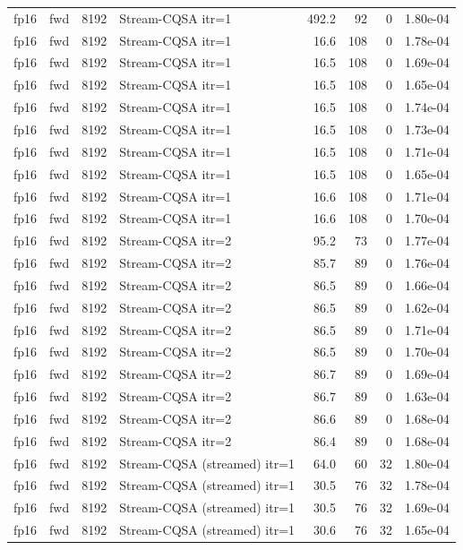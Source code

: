 \begin{tabular}{llrlrrrl}
fp16 & fwd & 8192 & Stream-CQSA itr=1 & 492.2 & 92 & 0 & 1.80e-04 \\
fp16 & fwd & 8192 & Stream-CQSA itr=1 & 16.6 & 108 & 0 & 1.78e-04 \\
fp16 & fwd & 8192 & Stream-CQSA itr=1 & 16.5 & 108 & 0 & 1.69e-04 \\
fp16 & fwd & 8192 & Stream-CQSA itr=1 & 16.5 & 108 & 0 & 1.65e-04 \\
fp16 & fwd & 8192 & Stream-CQSA itr=1 & 16.5 & 108 & 0 & 1.74e-04 \\
fp16 & fwd & 8192 & Stream-CQSA itr=1 & 16.5 & 108 & 0 & 1.73e-04 \\
fp16 & fwd & 8192 & Stream-CQSA itr=1 & 16.5 & 108 & 0 & 1.71e-04 \\
fp16 & fwd & 8192 & Stream-CQSA itr=1 & 16.5 & 108 & 0 & 1.65e-04 \\
fp16 & fwd & 8192 & Stream-CQSA itr=1 & 16.6 & 108 & 0 & 1.71e-04 \\
fp16 & fwd & 8192 & Stream-CQSA itr=1 & 16.6 & 108 & 0 & 1.70e-04 \\
fp16 & fwd & 8192 & Stream-CQSA itr=2 & 95.2 & 73 & 0 & 1.77e-04 \\
fp16 & fwd & 8192 & Stream-CQSA itr=2 & 85.7 & 89 & 0 & 1.76e-04 \\
fp16 & fwd & 8192 & Stream-CQSA itr=2 & 86.5 & 89 & 0 & 1.66e-04 \\
fp16 & fwd & 8192 & Stream-CQSA itr=2 & 86.5 & 89 & 0 & 1.62e-04 \\
fp16 & fwd & 8192 & Stream-CQSA itr=2 & 86.5 & 89 & 0 & 1.71e-04 \\
fp16 & fwd & 8192 & Stream-CQSA itr=2 & 86.5 & 89 & 0 & 1.70e-04 \\
fp16 & fwd & 8192 & Stream-CQSA itr=2 & 86.7 & 89 & 0 & 1.69e-04 \\
fp16 & fwd & 8192 & Stream-CQSA itr=2 & 86.7 & 89 & 0 & 1.63e-04 \\
fp16 & fwd & 8192 & Stream-CQSA itr=2 & 86.6 & 89 & 0 & 1.68e-04 \\
fp16 & fwd & 8192 & Stream-CQSA itr=2 & 86.4 & 89 & 0 & 1.68e-04 \\
fp16 & fwd & 8192 & Stream-CQSA (streamed) itr=1 & 64.0 & 60 & 32 & 1.80e-04 \\
fp16 & fwd & 8192 & Stream-CQSA (streamed) itr=1 & 30.5 & 76 & 32 & 1.78e-04 \\
fp16 & fwd & 8192 & Stream-CQSA (streamed) itr=1 & 30.5 & 76 & 32 & 1.69e-04 \\
fp16 & fwd & 8192 & Stream-CQSA (streamed) itr=1 & 30.6 & 76 & 32 & 1.65e-04 \\

\end{tabular}
